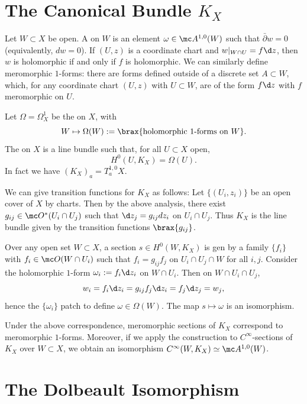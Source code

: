 \documentclass[11pt]{report}
\begin{document}
\section{\texorpdfstring{The Canonical Bundle $K_X$}{The Canonical Bundle KX}}

\begin{defn}
Let $W \subset X$ be open. A  on $W$ is an element $\omega \in \mc A^{1,0}(W)$ such that $\bar \partial w =0$ (equivalently, $dw=0$). If $(U,z)$ is a coordinate chart and $w|_{W \cap U} = f\d z$, then $w$ is holomorphic if and only if $f$ is holomorphic. We can similarly define meromorphic $1$-forms: there are forms defined outside of a discrete set $A \subset W$, which, for any coordinate chart $(U,z)$ with $U \subset W$, are of the form $f\d z$ with $f$ meromorphic on $U$.

Let $\Omega = \Omega^1_X$ be the  on $X$, with
\[
W \mapsto \Omega(W) := \brax{ \text{holomorphic 1-forms on }W}.
\]
The  on $X$ is a line bundle such that, for all $U \subset X$ open,
\[
H^0(U,K_X)=\Omega(U).
\]
In fact we have $(K_X)_a = T^{1,0}_aX$.
\end{defn}

We can give transition functions for $K_X$ as follows: Let $\{(U_i,z_i)\}$ be an open cover of $X$ by charts. Then by the above analysis, there exist $g_{ij} \in \mc O^*(U_i \cap U_j)$ such that $\d z_j=g_{ij}d z_i$ on $U_i \cap U_j$. Thus $K_X$ is the line bundle given by the transition functions $\brax{g_{ij}}$.

Over any open set $W \subset X$, a section $s \in H^0(W,K_X)$ is gen by a family $\{f_i\}$ with $f_i \in \mc O(W \cap U_i)$ such that $f_i = g_{ij}f_j$ on $U_i \cap U_j \cap W$ for all $i,j$. Consider the holomorphic $1$-form $\omega_i := f_i\d z_i$ on $W \cap U_i$. Then on $W \cap U_i \cap U_j$, 
$$w_i = f_i\d z_i=g_{ij}f_j\d z_i=f_j\d z_j=w_j,$$ hence the $\{\omega_i\}$ patch to define $\omega \in \Omega (W)$. The map $s \mapsto \omega$ is an isomorphism.

\begin{rmk}
Under the above correspondence, meromorphic sections of $K_X$ correspond to meromorphic $1$-forms. Moreover, if we apply the construction to $C^\infty$-sections of $K_X$ over $W \subset X$, we obtain an isomorphism $C^\infty (W,K_X)\simeq \mc A^{1,0}(W)$.
\end{rmk}

\section{The Dolbeault Isomorphism}
\end{document}
